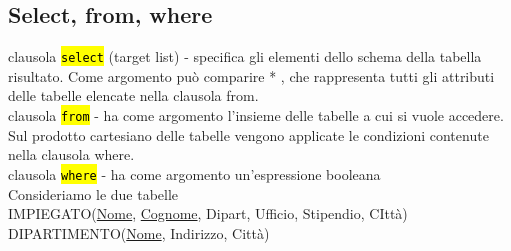 \documentclass[a4paper]{article}
\begin{document}
\subsection{Select, from, where}
clausola \hl{\texttt{select}} (target list) - specifica gli elementi dello schema della tabella risultato. Come argomento può comparire * , che rappresenta tutti gli attributi delle tabelle elencate nella clausola from.\medskip\\
%
clausola \hl{\texttt{from}} - ha come argomento l’insieme delle tabelle a cui si vuole accedere. Sul prodotto cartesiano delle tabelle vengono applicate le condizioni contenute nella clausola where.\medskip\\
%
clausola \hl{\texttt{where}} - ha come argomento un’espressione booleana\medskip\medskip\medskip\\
%
Consideriamo le due tabelle\\
IMPIEGATO(\underline{Nome}, \underline{Cognome}, Dipart, Ufficio, Stipendio, CIttà)\\
DIPARTIMENTO(\underline{Nome}, Indirizzo, Città)
\end{document}
